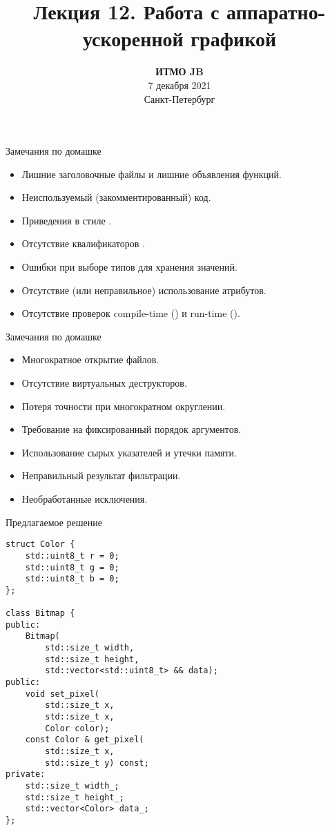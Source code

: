 \documentclass{beamer}
\title{Лекция 12. Работа с аппаратно-ускоренной графикой}
\date{
   \textbf{ИТМО JB}\\
   7 декабря 2021 \\
   Санкт-Петербург
}
\begin{document}
\begin{frame} 
  \titlepage
\end{frame}

\begin{frame}[fragile]{Замечания по домашке}
    \begin{itemize}
        \item Лишние заголовочные файлы и лишние объявления функций.
        \item Неиспользуемый (закомментированный) код.
        \item Приведения в стиле \langc.
        \item Отсутствие квалификаторов .
        \item Ошибки при выборе типов для хранения значений.
        \item Отсутствие (или неправильное) использование атрибутов.
        \item Отсутствие проверок compile-time () и run-time ().
    \end{itemize}
\end{frame}

\begin{frame}[fragile]{Замечания по домашке}
    \begin{itemize}
        \item Многократное открытие файлов.
        \item Отсутствие виртуальных деструкторов.
        \item Потеря точности при многократном округлении.
        \item Требование на фиксированный порядок аргументов.
        \item Использование сырых указателей и утечки памяти.
        \item Неправильный результат фильтрации.
        \item Необработанные исключения.
    \end{itemize}
\end{frame}

\begin{frame}[fragile]{Предлагаемое решение}
    \small
    \begin{lstlisting}
struct Color {
    std::uint8_t r = 0;
    std::uint8_t g = 0;
    std::uint8_t b = 0;
};

class Bitmap {
public:
    Bitmap(
        std::size_t width,
        std::size_t height,
        std::vector<std::uint8_t> && data);
public:
    void set_pixel(
        std::size_t x,
        std::size_t x,
        Color color);
    const Color & get_pixel(
        std::size_t x,
        std::size_t y) const;
private:
    std::size_t width_;
    std::size_t height_;
    std::vector<Color> data_;
};
    \end{lstlisting}
\end{frame}
\end{document}
